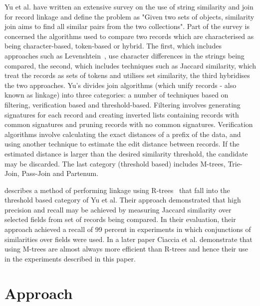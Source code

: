 \documentclass{llncs}
\begin{document}
Yu et al. \cite{Yu2016} have written an extensive survey on the use of string similarity and join for record linkage and define the problem as "Given two sets of objects, similarity join aims to find all similar pairs from the two collections". Part of the survey is concerned the algorithms used to compare two records which are characterised as being character-based, token-based or hybrid. The first, which includes approaches such as Levenshtein~\cite{Levenshtein66}, use character differences in the strings being compared, the second, which includes techniques such as Jaccard similarity, which treat the records as sets of tokens and utilises set similarity, the third hybridises the two approaches. Yu's divides join algorithms (which unify records - also known as linkage) into three categories: a number of techniques based on filtering, verification based and threshold-based. Filtering involves generating signatures for each record and creating inverted lists containing records with common signatures and pruning records with no common signatures. Verification algorithms involve calculating the exact distances of a prefix of the data, and using another technique to estimate the edit distance between records. If the estimated distance is larger than the desired similarity threshold, the candidate may be discarded. The last category (threshold based) includes M-trees, Trie-Join, Pass-Join and Partenum.  

\cite{Li2006} describes a method of performing linkage using R-trees~\cite{Hjaltason1998} that fall into the threshold based category of Yu et al. Their approach demonstrated that high precision and recall may be achieved by measuring Jaccard similarity over selected fields from set of records being compared. In their evaluation, their approach achieved a recall of 99 percent in experiments in which conjunctions of similarities over fields were used. In a later paper \cite{Ciaccia97indexingmetric}  Ciaccia et al. demonstrate that using M-trees are almost always more efficient than R-trees and hence their use in the experiments described in this paper.



\section{Approach}
\label{sec-approach}
\end{document}
